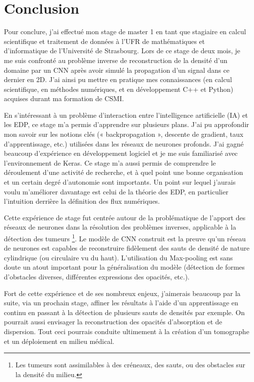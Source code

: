 
\chapter{Conclusion} %

\label{Chapter6} %


Pour conclure, j’ai effectué mon stage de master 1 en tant que stagiaire en calcul scientifique et traitement de données à l'UFR de mathématiques et d'informatique de l'Université de Strasbourg. Lors de ce stage de deux mois, je me suis confronté au problème inverse de reconstruction de la densité d'un domaine par un CNN après avoir simulé la propagation d'un signal dans ce dernier en 2D. J’ai ainsi pu mettre en pratique mes connaissances (en calcul scientifique, en méthodes numériques, et en développement C++ et Python) acquises durant ma formation de CSMI.

En s'intéressant à un problème d'interaction entre l'intelligence artificielle (IA) et les EDP, ce stage m'a permis d'apprendre sur plusieurs plans. J'ai pu approfondir mon savoir sur les notions clés (« backpropagation », descente de gradient, taux d'apprentissage, etc.) utilisées dans les réseaux de neurones profonds. J'ai gagné beaucoup d'expérience en développement logiciel et je me suis familiarisé avec l'environnement de Keras. Ce stage m’a aussi permis de comprendre le déroulement d'une activité de recherche, et à quel point une bonne organisation et un certain degré d'autonomie sont importants. Un point sur lequel j'aurais voulu m'améliorer davantage est celui de la théorie des EDP, en particulier l'intuition derrière la définition des flux numériques. 

Cette expérience de stage fut centrée autour de la problématique de l'apport des réseaux de neurones dans la résolution des problèmes inverses, applicable à la détection des tumeurs \footnote{Les tumeurs sont assimilables à des créneaux, des sauts, ou des obstacles sur la densité du milieu.}. Le modèle de CNN construit est la preuve qu'un réseau de neurones est capables de reconstruire fidèlement des sauts de densité de nature cylindrique (ou circulaire vu du haut). L'utilisation du Max-pooling est sans doute un atout important pour la généralisation du modèle (détection de formes d'obstacles diverses, différentes expressions des opacités, etc.).

Fort de cette expérience et de ses nombreux enjeux, j'aimerais beaucoup par la suite, via un prochain stage, affiner les résultats à l'aide d'un apprentissage en continu en passant à la détection de plusieurs sauts de densités par exemple. On pourrait aussi envisager la reconstruction des opacités d'absorption et de dispersion. Tout ceci pourrais conduite ultimement à la création d'un tomographe et un déploiement en milieu médical.
